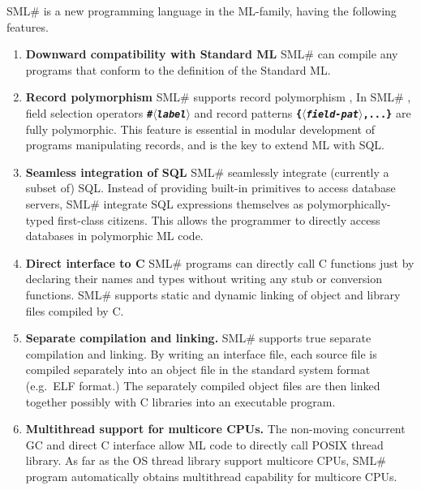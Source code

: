 \documentclass{jbook}
\newcommand{\smlsharp}{SML\#}
\newcommand{\nonterm}[1]{\mbox{$\langle$}{\it #1}\mbox{$\rangle$}}
\begin{document}
\else%
	\smlsharp{} is a new programming language in the ML-family,
having the following features.
\begin{enumerate}
\item {\bf Downward compatibility with Standard ML}
	\smlsharp{} can compile any programs that conform to the
definition of the Standard ML\cite{sml}.

\item {\bf Record polymorphism}
	\smlsharp{} supports record polymorphism \cite{ohor95toplas},
	In \smlsharp{} , field selection operators {\bf\tt \#\nonterm{label}}
and record patterns {\bf\tt \{\nonterm{field-pat},...\}} are fully
polymorphic.
	This feature is essential in modular development of programs
manipulating records, and is the key to extend ML with SQL.

\item {\bf Seamless integration of SQL}
	\smlsharp{} seamlessly integrate (currently a subset of) SQL.
	Instead of providing built-in primitives to access
database servers, \smlsharp{} integrate SQL expressions themselves as
polymorphically-typed first-class citizens.
	This allows the programmer to directly access databases in
polymorphic ML code.

\item {\bf Direct interface to C}
	\smlsharp{} programs can directly call C functions just by
declaring their names and types without writing any stub or conversion
functions.
	\smlsharp{} supports static and dynamic linking of object and
library files compiled by C.

\item {\bf Separate compilation and linking.}
	\smlsharp{} supports true separate compilation and linking.
	By writing an interface file, each source file is compiled
separately into an object file in the standard system format (e.g.\ ELF
format.)
	The separately compiled object files are then linked together
possibly with C libraries into an executable program.

\item {\bf Multithread support for multicore CPUs.}
	The non-moving concurrent GC \cite{ueno11icfp} and direct C
interface allow ML code to directly  call POSIX thread library.
	As far as the OS thread library support multicore CPUs,
\smlsharp{} program automatically obtains multithread capability for
multicore CPUs.

\end{enumerate}
\end{document}
